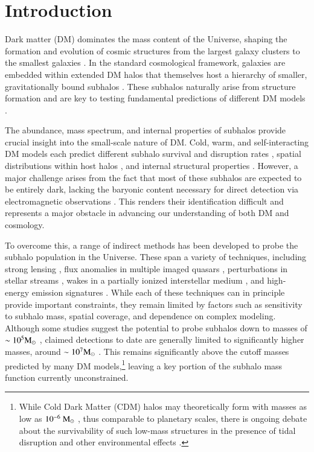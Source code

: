 \documentclass[fleqn,usenatbib]{mnras}
\newcommand{\msun}{\rm M_\odot}
\begin{document}


\section{Introduction} \label{sec: intro}

Dark matter (DM) dominates the mass content of the Universe, shaping the formation and evolution of cosmic structures from the largest galaxy clusters to the smallest galaxies \citep{Frenk&White12,Planck_collaboration+15_cosmopars}. In the standard cosmological framework, galaxies are embedded within extended DM halos that themselves host a hierarchy of smaller, gravitationally bound subhalos \citep{Zavala&Frenk19}. These subhalos naturally arise from structure formation and are key to testing fundamental predictions of different DM models \citep{Bullock&Boylan-Kolchin17}.

The abundance, mass spectrum, and internal properties of subhalos provide crucial insight into the small-scale nature of DM. Cold, warm, and self-interacting DM models each predict different subhalo survival and disruption rates \citep{Chiang+24}, spatial distributions within host halos \citep*{Yang+23}, and internal structural properties \citep{Colin+02}. However, a major challenge arises from the fact that most of these subhalos are expected to be entirely dark, lacking the baryonic content necessary for direct detection via electromagnetic observations \citep{Benitez-Llambay&Frenk20}. This renders their identification difficult and represents a major obstacle in advancing our understanding of both DM and cosmology.

To overcome this, a range of indirect methods has been developed to probe the subhalo population in the Universe. These span a variety of techniques, including strong lensing \citep{Nadler+21}, flux anomalies in multiple imaged quasars \citep{Mao&Schneider98}, perturbations in stellar streams \citep{Erkal+16}, wakes in a partially ionized interstellar medium \citep{Delos25}, and high-energy emission signatures \citep{Zechlin+12}. 
While each of these techniques can in principle provide important constraints, they remain limited by factors such as sensitivity to subhalo mass, spatial coverage, and dependence on complex modeling. Although some studies suggest the potential to probe subhalos down to masses of $\sim 10^{5}\msun$ \citep[e.g.][]{Bovy+17, Drlica-Wagner+19}, claimed detections to date are generally limited to significantly higher masses, around $\sim 10^{7}\msun$ \citep[e.g.][]{Bonaca+19, Banik+21}.
This remains significantly above the cutoff masses predicted by many DM models,\footnote{While Cold Dark Matter (CDM) halos may theoretically form with masses as low as $10^{-6}~\msun$ \citep{BFPR84, Wang+20}, thus comparable to planetary scales, there is ongoing debate about the survivability of such low-mass structures in the presence of tidal disruption and other environmental effects \citep{Taylor&Babul01, Hayashi+03, Errani&Navarro21}.} leaving a key portion of the subhalo mass function currently unconstrained.
\end{document}
